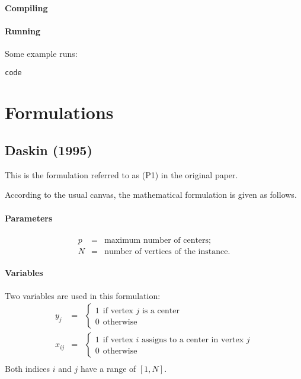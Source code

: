 \documentclass[a4paper,10pt]{article}
\begin{document}
\paragraph{Compiling}

\paragraph{Running}
Some example runs:
\begin{lstlisting}
code
\end{lstlisting}

\section{Formulations}
\subsection{Daskin (1995)}
	This is the formulation referred to as (P1) in the original paper.
	
	According to the usual canvas, the mathematical formulation is given as follows.
	\paragraph{Parameters} 
	\begin{eqnarray*}
		p &=& \text{maximum number of centers;} \\
		N &=& \text{number of vertices of the instance.} 
	\end{eqnarray*}
	\paragraph{Variables} Two variables are used in this formulation:
	\begin{eqnarray*}
		y_j &=& \begin{cases}
 				1 ~~\text{if vertex $j$ is a center} \\
 				0 ~~\text{otherwise}
 			\end{cases} \\
 		x_{ij} &=& \begin{cases}
 				1 ~~\text{if vertex $i$ assigns to a center in vertex $j$} \\
 				0 ~~\text{otherwise}
 			\end{cases} \\
	\end{eqnarray*}
	Both indices $i$ and $j$ have a range of $[1, N]$.
	
\end{document}
